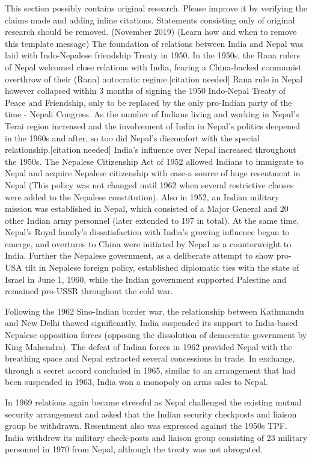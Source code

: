 \documentclass[
  openany]{book}
\begin{document}
This section possibly contains original research. Please improve it by verifying the claims made and adding inline citations. Statements consisting only of original research should be removed. (November 2019) (Learn how and when to remove this template message)
The foundation of relations between India and Nepal was laid with Indo-Nepalese friendship Treaty in 1950. In the 1950s, the Rana rulers of Nepal welcomed close relations with India, fearing a China-backed communist overthrow of their (Rana) autocratic regime.{[}citation needed{]} Rana rule in Nepal however collapsed within 3 months of signing the 1950 Indo-Nepal Treaty of Peace and Friendship, only to be replaced by the only pro-Indian party of the time - Nepali Congress. As the number of Indians living and working in Nepal's Terai region increased and the involvement of India in Nepal's politics deepened in the 1960s and after, so too did Nepal's discomfort with the special relationship.{[}citation needed{]} India's influence over Nepal increased throughout the 1950s. The Nepalese Citizenship Act of 1952 allowed Indians to immigrate to Nepal and acquire Nepalese citizenship with ease-a source of huge resentment in Nepal (This policy was not changed until 1962 when several restrictive clauses were added to the Nepalese constitution). Also in 1952, an Indian military mission was established in Nepal, which consisted of a Major General and 20 other Indian army personnel (later extended to 197 in total). At the same time, Nepal's Royal family's dissatisfaction with India's growing influence began to emerge, and overtures to China were initiated by Nepal as a counterweight to India. Further the Nepalese government, as a deliberate attempt to show pro-USA tilt in Nepalese foreign policy, established diplomatic ties with the state of Israel in June 1, 1960, while the Indian government supported Palestine and remained pro-USSR throughout the cold war.

Following the 1962 Sino-Indian border war, the relationship between Kathmandu and New Delhi thawed significantly. India suspended its support to India-based Nepalese opposition forces (opposing the dissolution of democratic government by King Mahendra). The defeat of Indian forces in 1962 provided Nepal with the breathing space and Nepal extracted several concessions in trade. In exchange, through a secret accord concluded in 1965, similar to an arrangement that had been suspended in 1963, India won a monopoly on arms sales to Nepal.

In 1969 relations again became stressful as Nepal challenged the existing mutual security arrangement and asked that the Indian security checkposts and liaison group be withdrawn. Resentment also was expressed against the 1950s TPF. India withdrew its military check-posts and liaison group consisting of 23 military personnel in 1970 from Nepal, although the treaty was not abrogated.
\end{document}
